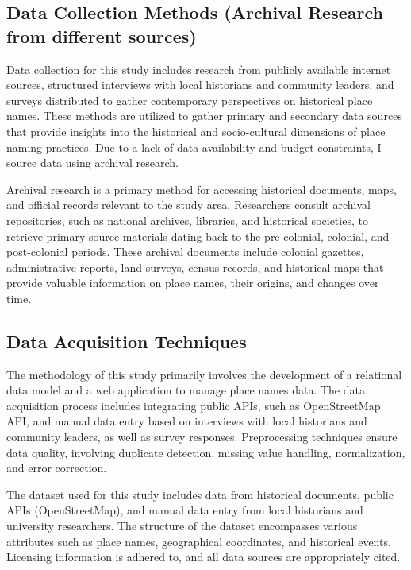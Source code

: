 \subsection{Data Collection Methods (Archival Research from different sources)}

Data collection for this study includes research from publicly available internet sources, structured interviews with local historians and community leaders, and surveys distributed to gather contemporary perspectives on historical place names. These methods are utilized to gather primary and secondary data sources that provide insights into the historical and socio-cultural dimensions of place naming practices. Due to a lack of data availability and budget constraints, I source data using archival research.

Archival research is a primary method for accessing historical documents, maps, and official records relevant to the study area. Researchers consult archival repositories, such as national archives, libraries, and historical societies, to retrieve primary source materials dating back to the pre-colonial, colonial, and post-colonial periods. These archival documents include colonial gazettes, administrative reports, land surveys, census records, and historical maps that provide valuable information on place names, their origins, and changes over time.


\subsection{Data Acquisition Techniques}

The methodology of this study primarily involves the development of a relational data model and a web application to manage place names data. The data acquisition process includes integrating public APIs, such as OpenStreetMap API, and manual data entry based on interviews with local historians and community leaders, as well as survey responses. Preprocessing techniques ensure data quality, involving duplicate detection, missing value handling, normalization, and error correction.

The dataset used for this study includes data from historical documents, public APIs (OpenStreetMap), and manual data entry from local historians and university researchers. The structure of the dataset encompasses various attributes such as place names, geographical coordinates, and historical events. Licensing information is adhered to, and all data sources are appropriately cited.

